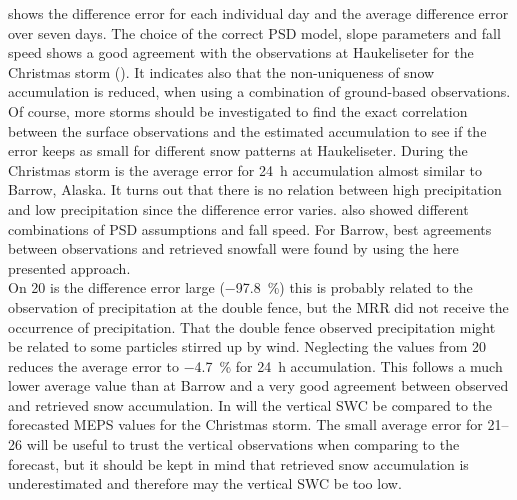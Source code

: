 \noindent
{} shows the difference error for each individual day and the average difference error over seven days.
The choice of the correct PSD model, slope parameters and fall speed shows a good agreement with the observations at Haukeliseter for the Christmas storm (). It indicates also that the non-uniqueness of snow accumulation is reduced, when using a combination of ground-based observations. Of course, more storms should be investigated to find the exact correlation between the surface observations and the estimated accumulation to see if the error keeps as small for different snow patterns at Haukeliseter. During the Christmas storm  is the average error for \SI{24}{\hour} accumulation almost similar to Barrow, Alaska. It turns out that there is no relation between high precipitation and low precipitation since the difference error varies. \citet{cooper_variational_2017} also showed different combinations of PSD assumptions and fall speed. For Barrow, best agreements between observations and retrieved snowfall were found by using the here presented approach.
\\
On \SI{20}{\dec} is the difference error large (\SI{-97.8}{\percent}) this is probably related to the observation of precipitation at the double fence, but the MRR did not receive the occurrence of precipitation. That the double fence observed precipitation might be related to some particles stirred up by wind. Neglecting the values from \SI{20}{\dec} reduces the average error to \SI{-4.7}{\percent} for \SI{24}{\hour} accumulation. This follows a much lower average value than at Barrow and a very good agreement between observed and retrieved snow accumulation. In  will the vertical SWC be compared to the forecasted MEPS values for the Christmas storm. The small average error for \SIrange{21}{26}{\dec} will be useful to trust the vertical observations when comparing to the forecast, but it should be kept in mind that retrieved snow accumulation is underestimated and therefore may the vertical SWC be too low.

